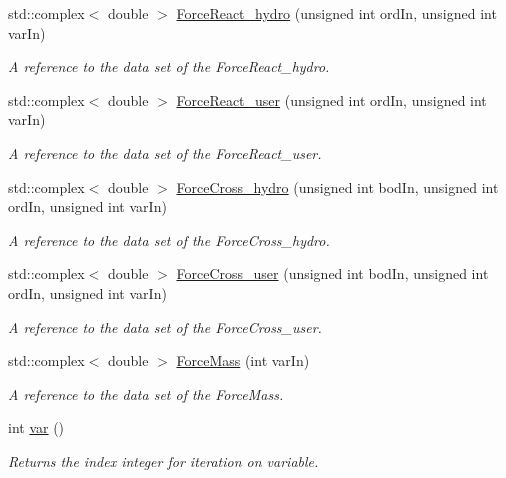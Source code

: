 \begin{DoxyCompactItemize}
std\-::complex$<$ double $>$ \hyperlink{classosea_1_1ofreq_1_1_equationof_motion_a4962df48c786fced4e953e50f1d82a3a}{Force\-React\-\_\-hydro} (unsigned int ord\-In, unsigned int var\-In)
\begin{DoxyCompactList}\small\item\em A reference to the data set of the Force\-React\-\_\-hydro. \end{DoxyCompactList}\item 
std\-::complex$<$ double $>$ \hyperlink{classosea_1_1ofreq_1_1_equationof_motion_ac1f572e423c09b9e9fa955f52434a8f7}{Force\-React\-\_\-user} (unsigned int ord\-In, unsigned int var\-In)
\begin{DoxyCompactList}\small\item\em A reference to the data set of the Force\-React\-\_\-user. \end{DoxyCompactList}\item 
std\-::complex$<$ double $>$ \hyperlink{classosea_1_1ofreq_1_1_equationof_motion_af1d1f42b77561e9f1c4110e16af309da}{Force\-Cross\-\_\-hydro} (unsigned int bod\-In, unsigned int ord\-In, unsigned int var\-In)
\begin{DoxyCompactList}\small\item\em A reference to the data set of the Force\-Cross\-\_\-hydro. \end{DoxyCompactList}\item 
std\-::complex$<$ double $>$ \hyperlink{classosea_1_1ofreq_1_1_equationof_motion_a3b06b1ff4b792ad3a3d3c0274426d5ed}{Force\-Cross\-\_\-user} (unsigned int bod\-In, unsigned int ord\-In, unsigned int var\-In)
\begin{DoxyCompactList}\small\item\em A reference to the data set of the Force\-Cross\-\_\-user. \end{DoxyCompactList}\item 
std\-::complex$<$ double $>$ \hyperlink{classosea_1_1ofreq_1_1_equationof_motion_a848b45b70d29d793b86a7c1ca8f97ed6}{Force\-Mass} (int var\-In)
\begin{DoxyCompactList}\small\item\em A reference to the data set of the Force\-Mass. \end{DoxyCompactList}\item 
int \hyperlink{classosea_1_1ofreq_1_1_equationof_motion_ab69511cc5037376cf7da80ce30d9eaab}{var} ()
\begin{DoxyCompactList}\small\item\em Returns the index integer for iteration on variable. \end{DoxyCompactList}\item 

\end{DoxyCompactItemize}

